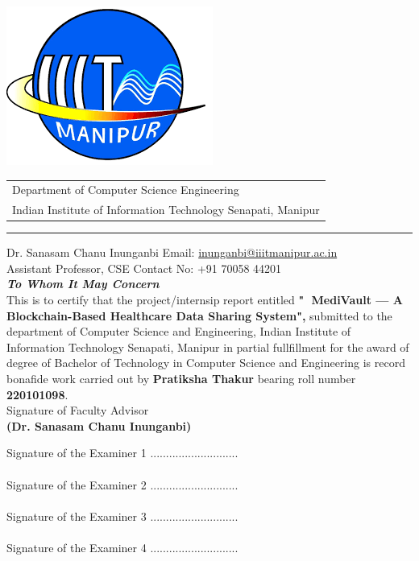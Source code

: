 \documentclass[a4paper, 11pt, oneside]{report}
\begin{document}
\begin{center}
	\thispagestyle{empty}
		
		\begin{table}
			\centering
			\includegraphics[scale=0.2]{report_file/iiit manipur.png}
			\begin{tabular}{l}
				Department of Computer Science Engineering \\
				Indian Institute of Information Technology Senapati, Manipur \\
			\end{tabular}
		\end{table}
		\par\noindent\rule{\textwidth}{0.4pt}
			Dr. Sanasam Chanu Inunganbi
			\hspace*{\fill} Email: \href{mailto:inunganbi@iiitmanipur.ac.in}{inunganbi@iiitmanipur.ac.in}\\
			Assistant Professor, CSE
			\hspace*{0pt}\hfill Contact No: +91 70058 44201\\[2cm]
			{\Huge \textbf{\emph{To Whom It May Concern}}}\\[2cm]
			\linespread{1.13}
			\large{This is to certify that the project/internsip report 
                entitled \textbf{"🌿 MediVault — A Blockchain-Based Healthcare Data Sharing System",} submitted to the department of Computer Science and Engineering, Indian Institute of Information Technology Senapati, Manipur in partial fullfillment for the award of degree of Bachelor of Technology in Computer Science and Engineering is record bonafide work carried out by \textbf{Pratiksha Thakur} bearing roll number \textbf{220101098}.}\\[2.0cm]
			\hspace*{2.6in}\large{Signature of Faculty Advisor}\\[0.3cm]
			\hspace*{2.5in}\textbf{(Dr. Sanasam Chanu Inunganbi)}\\[0.5cm]
			
	\end{center}
        \vspace{0.5cm}
	Signature of the Examiner 1 ............................\\\\
	Signature of the Examiner 2 ............................\\\\
	Signature of the Examiner 3 ............................\\\\
	Signature of the Examiner 4 ............................\\\\
	\newpage
 
\end{document}
